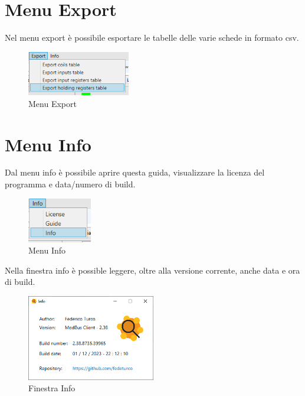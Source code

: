 \newpage
\section{Menu Export}

Nel menu export è possibile esportare le tabelle delle varie schede in formato csv.

\begin{figure}[H]
\centering
\includegraphics[width=0.4\textwidth]{../Img/Menu_Export.PNG}
\caption{Menu Export}
\end{figure}

\section{Menu Info}

Dal menu info è possibile aprire questa guida, visualizzare la licenza del programma e
data/numero di build.

\begin{figure}[H]
\centering
\includegraphics[width=0.25\textwidth]{../Img/Menu_Info.PNG}
\caption{Menu Info}
\end{figure}

Nella finestra info è possible leggere, oltre alla versione corrente, anche data e ora di build.

\begin{figure}[H]
\centering
\includegraphics[width=0.5\textwidth]{../Img/Finestra_Info.PNG}
\caption{Finestra Info}
\end{figure}